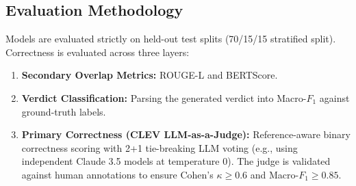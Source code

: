 \documentclass[11pt,a4paper]{article}
\begin{document}
\subsection{Evaluation Methodology}
Models are evaluated strictly on held-out test splits (70/15/15 stratified split). Correctness is evaluated across three layers:
\begin{enumerate}
    \item \textbf{Secondary Overlap Metrics:} ROUGE-L and BERTScore.
    \item \textbf{Verdict Classification:} Parsing the generated verdict into Macro-$F_1$ against ground-truth labels.
    \item \textbf{Primary Correctness (CLEV LLM-as-a-Judge):} Reference-aware binary correctness scoring with 2+1 tie-breaking LLM voting (e.g., using independent Claude 3.5 models at temperature 0). The judge is validated against human annotations to ensure Cohen's $\kappa \ge 0.6$ and Macro-$F_1 \ge 0.85$.
\end{enumerate}
\end{document}
